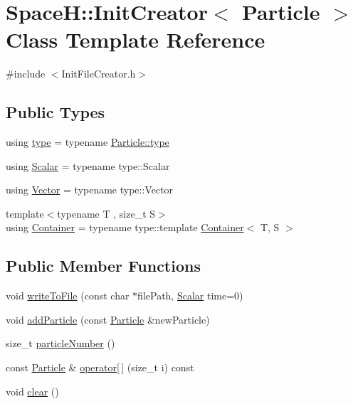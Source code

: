 \hypertarget{class_space_h_1_1_init_creator}{}\section{SpaceH\+:\+:Init\+Creator$<$ Particle $>$ Class Template Reference}
\label{class_space_h_1_1_init_creator}


{\ttfamily \#include $<$Init\+File\+Creator.\+h$>$}

\subsection*{Public Types}
\begin{DoxyCompactItemize}
\item 
using \mbox{\hyperlink{class_space_h_1_1_init_creator_abe67b1be453e00e5ce5d84fe0755cf24}{type}} = typename \mbox{\hyperlink{struct_space_h_1_1_particle_a4da7db09bcfc01d24c63468e6e08fa24}{Particle\+::type}}
\item 
using \mbox{\hyperlink{class_space_h_1_1_init_creator_ac049ccad04f7cd33cc95b17ad763a988}{Scalar}} = typename type\+::\+Scalar
\item 
using \mbox{\hyperlink{class_space_h_1_1_init_creator_ad355713fe020ed2c9fb0007cb4340340}{Vector}} = typename type\+::\+Vector
\item 
{\footnotesize template$<$typename T , size\+\_\+t S$>$ }\\using \mbox{\hyperlink{class_space_h_1_1_init_creator_a6e484fb8b2f46a2b1c4a54b782dec9d8}{Container}} = typename type\+::template \mbox{\hyperlink{class_space_h_1_1_init_creator_a6e484fb8b2f46a2b1c4a54b782dec9d8}{Container}}$<$ T, S $>$
\end{DoxyCompactItemize}
\subsection*{Public Member Functions}
\begin{DoxyCompactItemize}
\item 
void \mbox{\hyperlink{class_space_h_1_1_init_creator_a6cf46010b11b3b7ad19f1d37e2cb1cb4}{write\+To\+File}} (const char $\ast$file\+Path, \mbox{\hyperlink{class_space_h_1_1_init_creator_ac049ccad04f7cd33cc95b17ad763a988}{Scalar}} time=0)
\item 
void \mbox{\hyperlink{class_space_h_1_1_init_creator_a3d0b62c72c0bd432ca93ec3ec60f6153}{add\+Particle}} (const \mbox{\hyperlink{struct_space_h_1_1_particle}{Particle}} \&new\+Particle)
\item 
size\+\_\+t \mbox{\hyperlink{class_space_h_1_1_init_creator_ad6dde97c265c5336f5d9e16b36dfad5c}{particle\+Number}} ()
\item 
const \mbox{\hyperlink{struct_space_h_1_1_particle}{Particle}} \& \mbox{\hyperlink{class_space_h_1_1_init_creator_a3de1c9fb8bfd533fe69aa782d8d1bcb8}{operator\mbox{[}$\,$\mbox{]}}} (size\+\_\+t i) const
\item 
void \mbox{\hyperlink{class_space_h_1_1_init_creator_aa54d6696d3cd8cab4db3a284aaeb54ca}{clear}} ()
\end{DoxyCompactItemize}


